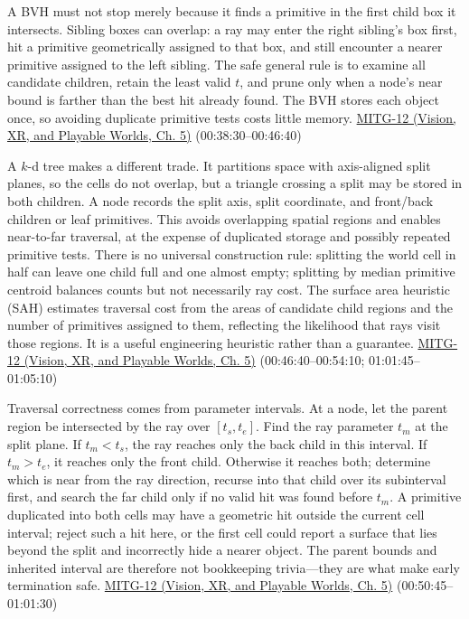 A BVH must not stop merely because it finds a primitive in the first child box it intersects. Sibling boxes can overlap: a ray may enter the right sibling's box first, hit a primitive geometrically assigned to that box, and still encounter a nearer primitive assigned to the left sibling. The safe general rule is to examine all candidate children, retain the least valid \(t\), and prune only when a node's near bound is farther than the best hit already found. The BVH stores each object once, so avoiding duplicate primitive tests costs little memory. \href{../07-Vision-XR-and-Playable-Worlds/main.pdf\#nameddest=04-visual-computing-ii-ch036-mitg-12---ray-tracing-ii}{MITG-12 (Vision, XR, and Playable Worlds, Ch. 5)} (00:38:30--00:46:40)

A \(k\)-d tree makes a different trade. It partitions space with axis-aligned split planes, so the cells do not overlap, but a triangle crossing a split may be stored in both children. A node records the split axis, split coordinate, and front/back children or leaf primitives. This avoids overlapping spatial regions and enables near-to-far traversal, at the expense of duplicated storage and possibly repeated primitive tests. There is no universal construction rule: splitting the world cell in half can leave one child full and one almost empty; splitting by median primitive centroid balances counts but not necessarily ray cost. The surface area heuristic (SAH) estimates traversal cost from the areas of candidate child regions and the number of primitives assigned to them, reflecting the likelihood that rays visit those regions. It is a useful engineering heuristic rather than a guarantee. \href{../07-Vision-XR-and-Playable-Worlds/main.pdf\#nameddest=04-visual-computing-ii-ch036-mitg-12---ray-tracing-ii}{MITG-12 (Vision, XR, and Playable Worlds, Ch. 5)} (00:46:40--00:54:10; 01:01:45--01:05:10)

Traversal correctness comes from parameter intervals. At a node, let the parent region be intersected by the ray over \([t_s,t_e]\). Find the ray parameter \(t_m\) at the split plane. If \(t_m<t_s\), the ray reaches only the back child in this interval. If \(t_m>t_e\), it reaches only the front child. Otherwise it reaches both; determine which is near from the ray direction, recurse into that child over its subinterval first, and search the far child only if no valid hit was found before \(t_m\). A primitive duplicated into both cells may have a geometric hit outside the current cell interval; reject such a hit here, or the first cell could report a surface that lies beyond the split and incorrectly hide a nearer object. The parent bounds and inherited interval are therefore not bookkeeping trivia---they are what make early termination safe. \href{../07-Vision-XR-and-Playable-Worlds/main.pdf\#nameddest=04-visual-computing-ii-ch036-mitg-12---ray-tracing-ii}{MITG-12 (Vision, XR, and Playable Worlds, Ch. 5)} (00:50:45--01:01:30)

